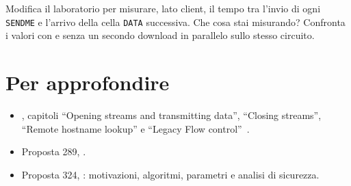 \begin{esercizio}[3]\label{es:11-rtt}
Modifica il laboratorio per misurare, lato client, il tempo tra l'invio di ogni \texttt{SENDME} e l'arrivo della cella \texttt{DATA} successiva. Che cosa stai misurando? Confronta i valori con e senza un secondo download in parallelo sullo stesso circuito.
\end{esercizio}

\section*{Per approfondire}
\begin{itemize}
  \item {}, capitoli \enquote{Opening streams and transmitting data}, \enquote{Closing streams}, \enquote{Remote hostname lookup} e \enquote{Legacy Flow control}~\cite{torspec}.
  \item Proposta 289, .
  \item Proposta 324, : motivazioni, algoritmi, parametri e analisi di sicurezza.
\end{itemize}
